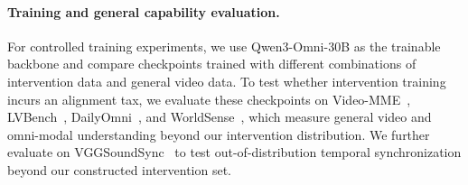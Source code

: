 \documentclass{llmxive}
\begin{document}
\paragraph{Training and general capability evaluation.}
For controlled training experiments, we use Qwen3-Omni-30B as the trainable backbone and compare checkpoints trained with different combinations of intervention data and general video data. To test whether intervention training incurs an alignment tax, we evaluate these checkpoints on Video-MME~\cite{DBLP:conf/cvpr/FuDLLRZWZSZCLLZ25}, LVBench~\cite{DBLP:journals/corr/abs-2406-08035}, DailyOmni~\cite{DBLP:journals/corr/abs-2505-17862}, and WorldSense~\cite{DBLP:journals/corr/abs-2502-04326}, which measure general video and omni-modal understanding beyond our intervention distribution. We further evaluate on VGGSoundSync~\cite{Chen21b} to test out-of-distribution temporal synchronization beyond our constructed intervention set.
\end{document}
